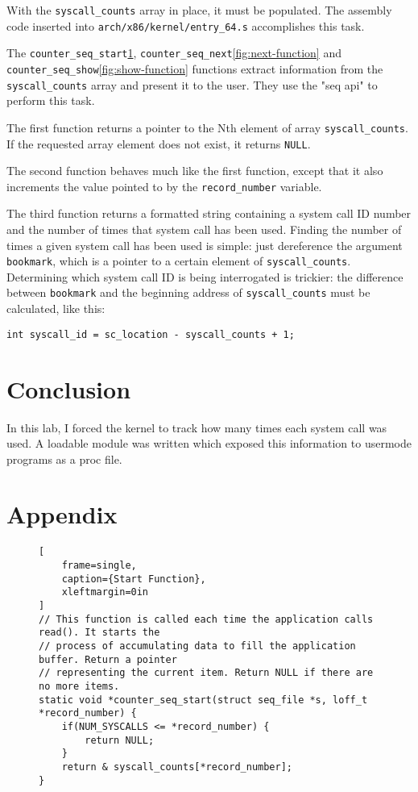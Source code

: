 \documentclass{article}
\begin{document}
With the \texttt{syscall\_counts} array in place, it must be populated. The
assembly code inserted into \texttt{arch/x86/kernel/entry\_64.s} accomplishes
this task.

The \texttt{counter\_seq\_start}\ref{fig:start-function},
\texttt{counter\_seq\_next}\ref{fig:next-function} and
\texttt{counter\_seq\_show}\ref{fig:show-function} functions extract information
from the \texttt{syscall\_counts} array and present it to the user. They use the
"seq api" to perform this task.

The first function returns a pointer to the Nth element of array
\texttt{syscall\_counts}. If the requested array element does not exist, it
returns \texttt{NULL}.

The second function behaves much like the first function, except that it also
increments the value pointed to by the \texttt{record\_number} variable.

The third function returns a formatted string containing a system call ID number
and the number of times that system call has been used. Finding the number of
times a given system call has been used is simple: just dereference the argument
\texttt{bookmark}, which is a pointer to a certain element of
\texttt{syscall\_counts}. Determining which system call ID is being interrogated
is trickier: the difference between \texttt{bookmark} and the beginning address
of \texttt{syscall\_counts} must be calculated, like this:
\begin{lstlisting}
int syscall_id = sc_location - syscall_counts + 1;
\end{lstlisting}

\section{Conclusion}
\label{sec:conclusion}

In this lab, I forced the kernel to track how many times each system call was
used. A loadable module was written which exposed this information to usermode
programs as a proc file.

\section{Appendix}
\label{sec:appendix}

\begin{figure}[tbhp] %
\label{fig:start-function}
\begin{lstlisting}[
    frame=single,
    caption={Start Function},
    xleftmargin=0in
]
// This function is called each time the application calls read(). It starts the
// process of accumulating data to fill the application buffer. Return a pointer
// representing the current item. Return NULL if there are no more items.
static void *counter_seq_start(struct seq_file *s, loff_t *record_number) {
    if(NUM_SYSCALLS <= *record_number) {
        return NULL;
    }
    return & syscall_counts[*record_number];
}
\end{lstlisting}
\end{figure}
\end{document}

